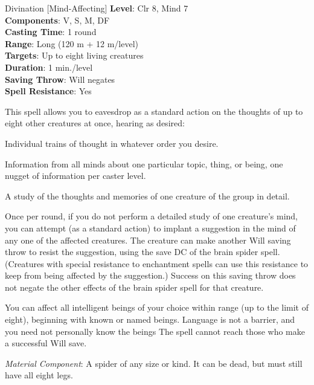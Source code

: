 {Divination [Mind-Affecting]}
{
	\textbf{Level}: Clr 8, Mind 7\\
	\textbf{Components}: V, S, M, DF\\
	\textbf{Casting Time}: 1 round\\
	\textbf{Range}: Long (120 m + 12 m/level)\\
	\textbf{Targets}: Up to eight living creatures\\
	\textbf{Duration}: 1 min./level\\
	\textbf{Saving Throw}: Will negates\\
	\textbf{Spell Resistance}: Yes\\
}
{
	This spell allows you to eavesdrop as a standard action on the thoughts of up to eight other creatures at once, hearing as desired:
	\begin{itemize*}
		\item Individual trains of thought in whatever order you desire.
		\item Information from all minds about one particular topic, thing, or being, one nugget of information per caster level.
		\item A study of the thoughts and memories of one creature of the group in detail.
	\end{itemize*}

	Once per round, if you do not perform a detailed study of one creature’s mind, you can attempt (as a standard action) to implant a suggestion in the mind of any one of the affected creatures. The creature can make another Will saving throw to resist the suggestion, using the save DC of the brain spider spell. (Creatures with special resistance to enchantment spells can use this resistance to keep from being affected by the suggestion.) Success on this saving throw does not negate the other effects of the brain spider spell for that creature.

	You can affect all intelligent beings of your choice within range (up to the limit of eight), beginning with known or named beings. Language is not a barrier, and you need not personally know the beings The spell cannot reach those who make a successful Will save.

	\textit{Material Component}: A spider of any size or kind. It can be dead, but must still have all eight legs.
}